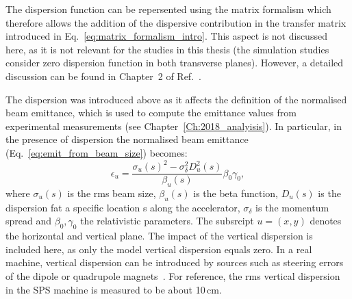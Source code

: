 The dispersion function can be repersented using the matrix formalism which therefore allows the addition of the dispersive contribution in the transfer matrix introduced in Eq.~\eqref{eq:matrix_formalism_intro}. This aspect is not discussed here, as it is not relevant for the studies in this thesis (the simulation studies consider zero dispersion function in both transverse planes). However, a detailed discussion can be found in Chapter~2 of Ref.~\cite{Lee:1425444}. %




The dispersion was introduced above as it affects the definition of the normalised beam emittance, which is used to compute the emittance values from experimental measurements (see Chapter~\ref{Ch:2018_analyisis}). In particular, in the presence of dispersion the normalised beam emittance (Eq.~\eqref{eq:emit_from_beam_size}) becomes:
\begin{equation}\label{eq:emit_from_beam_size_Du}
    \epsilon_{u} = \frac{\sigma_u(s)^2 - \sigma^2_\delta D_u^2(s)}{\beta_u(s)} \beta_0 \gamma_0,
\end{equation}
where $\sigma_u(s)$ is the rms beam size, $\beta_u(s)$ is the beta function, $D_u(s)$ is the dispersion fat a specific location s along the accelerator, $\sigma_\delta$ is the momentum spread and $\beta_0, \gamma_0$ the relativistic parameters. The subsrcipt $u=(x,y)$ denotes the horizontal and vertical plane.
The impact of the vertical dispersion is included here, as only the model vertical dispersion equals zero. In a real machine, vertical dispersion can be introduced by sources such as steering errors of the dipole or quadrupole magnets~\cite{Wolski_uspas}. For reference, the rms vertical dispersion in the SPS machine is measured to be about 10\,cm.


